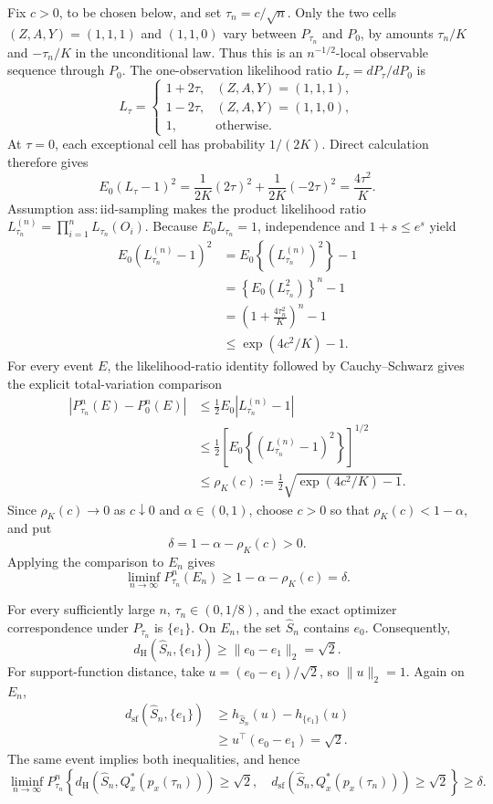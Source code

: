 Fix \(c>0\), to be chosen below, and set \(\tau_n=c/\sqrt n\).  Only the two cells \((Z,A,Y)=(1,1,1)\) and \((1,1,0)\) vary between \(P_{\tau_n}\) and \(P_0\), by amounts \(\tau_n/K\) and \(-\tau_n/K\) in the unconditional law.  Thus this is an \(n^{-1/2}\)-local observable sequence through \(P_0\).  The one-observation likelihood ratio \(L_\tau=dP_\tau/dP_0\) is
\[
 L_\tau=
 \begin{cases}
 1+2\tau,&(Z,A,Y)=(1,1,1),\\
 1-2\tau,&(Z,A,Y)=(1,1,0),\\
 1,&\text{otherwise}.
 \end{cases}
\]
At \(\tau=0\), each exceptional cell has probability \(1/(2K)\).  Direct calculation therefore gives
\[
 E_0(L_\tau-1)^2
 =\frac{1}{2K}(2\tau)^2+\frac{1}{2K}(-2\tau)^2
 =\frac{4\tau^2}{K}.
\]
Assumption \(\mathrm{ass{:}iid\text{-}sampling}\) makes the product likelihood ratio \(L_{\tau_n}^{(n)}=\prod_{i=1}^nL_{\tau_n}(O_i)\).  Because \(E_0L_{\tau_n}=1\), independence and \(1+s\leq e^s\) yield
\[
 \begin{aligned}
 E_0\!\left(L_{\tau_n}^{(n)}-1\right)^2
 &=E_0\!\left\{(L_{\tau_n}^{(n)})^2\right\}-1\\
 &=\left\{E_0(L_{\tau_n}^2)\right\}^n-1\\
 &=\left(1+\frac{4\tau_n^2}{K}\right)^n-1\\
 &\leq \exp(4c^2/K)-1.
 \end{aligned}
\]
For every event \(E\), the likelihood-ratio identity followed by Cauchy--Schwarz gives the explicit total-variation comparison
\[
 \begin{aligned}
 |P_{\tau_n}^n(E)-P_0^n(E)|
 &\leq\frac12E_0|L_{\tau_n}^{(n)}-1|\\
 &\leq\frac12\left[E_0\!\left\{(L_{\tau_n}^{(n)}-1)^2\right\}\right]^{1/2}\\
 &\leq \rho_K(c):=\frac12\sqrt{\exp(4c^2/K)-1}.
 \end{aligned}
\]
Since \(\rho_K(c)\to0\) as \(c\downarrow0\) and \(\alpha\in(0,1)\), choose \(c>0\) so that \(\rho_K(c)<1-\alpha\), and put
\[
 \delta=1-\alpha-\rho_K(c)>0.
\]
Applying the comparison to \(E_n\) gives
\[
 \liminf_{n\to\infty}P_{\tau_n}^n(E_n)
 \geq1-\alpha-\rho_K(c)=\delta.
\]

For every sufficiently large \(n\), \(\tau_n\in(0,1/8)\), and the exact optimizer correspondence under \(P_{\tau_n}\) is \(\{e_1\}\).  On \(E_n\), the set \(\widehat S_n\) contains \(e_0\).  Consequently,
\[
 d_{\mathrm H}(\widehat S_n,\{e_1\})
 \geq\lVert e_0-e_1\rVert_2=\sqrt2.
\]
For support-function distance, take \(u=(e_0-e_1)/\sqrt2\), so \(\lVert u\rVert_2=1\).  Again on \(E_n\),
\[
 \begin{aligned}
 d_{\mathrm{sf}}(\widehat S_n,\{e_1\})
 &\geq h_{\widehat S_n}(u)-h_{\{e_1\}}(u)\\
 &\geq u^\top(e_0-e_1)=\sqrt2.
 \end{aligned}
\]
The same event implies both inequalities, and hence
\[
 \liminf_{n\to\infty}P_{\tau_n}^n\!\left\{
 d_{\mathrm H}(\widehat S_n,Q_x^*(p_x(\tau_n)))\geq\sqrt2,
 \quad
 d_{\mathrm{sf}}(\widehat S_n,Q_x^*(p_x(\tau_n)))\geq\sqrt2
 \right\}\geq\delta.
\]

